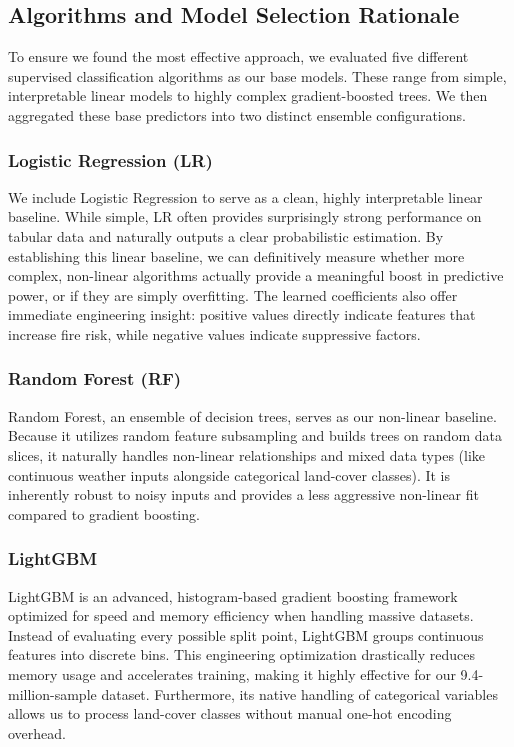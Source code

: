 \documentclass[11pt]{article}
\begin{document}
\subsection{Algorithms and Model Selection Rationale}

To ensure we found the most effective approach, we evaluated five different supervised classification algorithms as our base models. These range from simple, interpretable linear models to highly complex gradient-boosted trees. We then aggregated these base predictors into two distinct ensemble configurations.

\subsubsection{Logistic Regression (LR)}

We include Logistic Regression to serve as a clean, highly interpretable linear baseline. While simple, LR often provides surprisingly strong performance on tabular data and naturally outputs a clear probabilistic estimation. By establishing this linear baseline, we can definitively measure whether more complex, non-linear algorithms actually provide a meaningful boost in predictive power, or if they are simply overfitting. The learned coefficients also offer immediate engineering insight: positive values directly indicate features that increase fire risk, while negative values indicate suppressive factors.

\subsubsection{Random Forest (RF)}

Random Forest, an ensemble of decision trees, serves as our non-linear baseline. Because it utilizes random feature subsampling and builds trees on random data slices, it naturally handles non-linear relationships and mixed data types (like continuous weather inputs alongside categorical land-cover classes). It is inherently robust to noisy inputs and provides a less aggressive non-linear fit compared to gradient boosting.

\subsubsection{LightGBM}

LightGBM is an advanced, histogram-based gradient boosting framework optimized for speed and memory efficiency when handling massive datasets. Instead of evaluating every possible split point, LightGBM groups continuous features into discrete bins. This engineering optimization drastically reduces memory usage and accelerates training, making it highly effective for our 9.4-million-sample dataset. Furthermore, its native handling of categorical variables allows us to process land-cover classes without manual one-hot encoding overhead.
\end{document}
